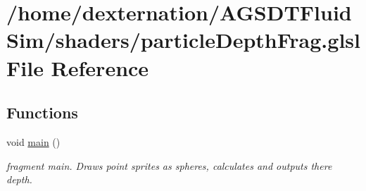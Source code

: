 \hypertarget{particle_depth_frag_8glsl}{\section{/home/dexternation/\-A\-G\-S\-D\-T\-Fluid\-Sim/shaders/particle\-Depth\-Frag.glsl File Reference}
\label{particle_depth_frag_8glsl}
}
\subsection*{Functions}
\begin{DoxyCompactItemize}
\item 
\hypertarget{particle_depth_frag_8glsl_acdef7a1fd863a6d3770c1268cb06add3}{void \hyperlink{particle_depth_frag_8glsl_acdef7a1fd863a6d3770c1268cb06add3}{main} ()}\label{particle_depth_frag_8glsl_acdef7a1fd863a6d3770c1268cb06add3}

\begin{DoxyCompactList}\small\item\em fragment main. Draws point sprites as spheres, calculates and outputs there depth. \end{DoxyCompactList}\end{DoxyCompactItemize}
